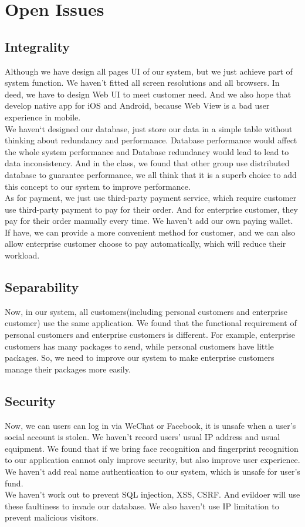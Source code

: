 \documentclass[12pt]{scrreprt}
\begin{document}
\chapter{Open Issues}
\section{Integrality}
Although we have design all pages UI of our system, but we just achieve part of system function. We haven't fitted all screen resolutions and all browsers. In deed, we have to design Web UI to meet customer need. And we also hope that develop native app for iOS and Android, because Web View is a bad user experience in mobile.\\
We haven‘t designed our database, just store our data in a simple table without thinking about redundancy and performance. Database performance would affect the whole system performance and Database redundancy would lead to lead to data inconsistency. And in the class, we found that other group use distributed database to guarantee performance, we all think that it is a superb choice to add this concept to our system to improve performance.\\
As for payment, we just use third-party payment service, which require customer use third-party payment to pay for their order. And for enterprise customer, they pay for their order manually every time. We haven't add our own paying wallet. If have, we can provide a more convenient method for customer, and we can also allow enterprise customer choose to pay automatically, which will reduce their workload.
\section{Separability}
Now, in our system, all customers(including personal customers and enterprise customer) use the same application. We found that the functional requirement of personal customers and enterprise customers is different. For example, enterprise customers has many packages to send, while personal customers have little packages. So, we need to improve our system to make enterprise customers manage their packages more easily.
\section{Security}
Now, we can users can log in via WeChat or Facebook, it is unsafe when a user's social account is stolen. We haven't record users' usual IP address and usual equipment. We found that if we bring face recognition and fingerprint recognition to our application cannot only improve security, but also improve user experience. We haven't add real name authentication to our system, which is unsafe for user's fund.\\
We haven't work out to prevent SQL injection, XSS, CSRF. And evildoer will use these faultiness to invade our database. We also haven't use IP limitation to prevent malicious visitors.
\end{document}
